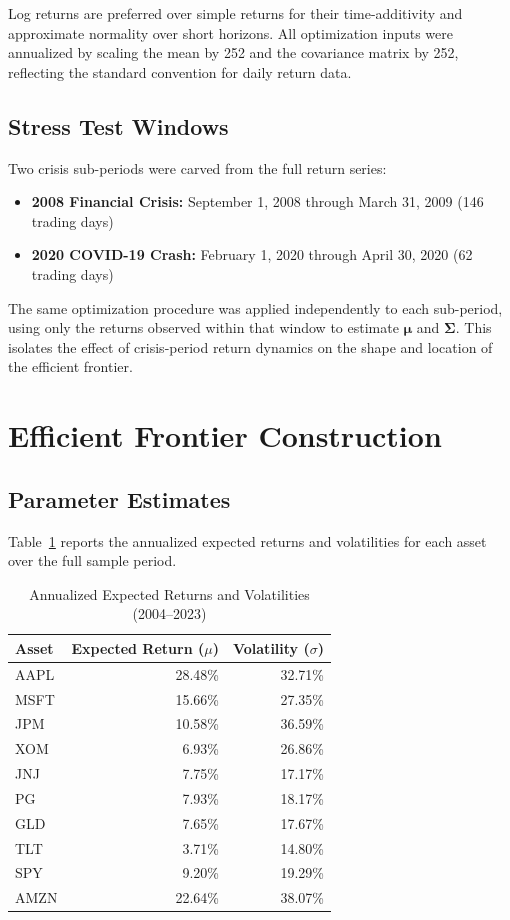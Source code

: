 \documentclass[12pt]{article}
\begin{document}
Log returns are preferred over simple returns for their time-additivity and
approximate normality over short horizons. All optimization inputs were
annualized by scaling the mean by 252 and the covariance matrix by 252,
reflecting the standard convention for daily return data.

\subsection{Stress Test Windows}

Two crisis sub-periods were carved from the full return series:
\begin{itemize}
  \item \textbf{2008 Financial Crisis:} September 1, 2008 through March 31,
        2009 (146 trading days)
  \item \textbf{2020 COVID-19 Crash:} February 1, 2020 through April 30,
        2020 (62 trading days)
\end{itemize}

The same optimization procedure was applied independently to each sub-period,
using only the returns observed within that window to estimate
$\boldsymbol{\mu}$ and $\boldsymbol{\Sigma}$. This isolates the effect of
crisis-period return dynamics on the shape and location of the efficient
frontier.

\section{Efficient Frontier Construction}
\label{sec:frontier}

\subsection{Parameter Estimates}

Table~\ref{tab:params} reports the annualized expected returns and volatilities
for each asset over the full sample period.

\begin{table}[H]
  \centering
  \caption{Annualized Expected Returns and Volatilities (2004--2023)}
  \label{tab:params}
  \begin{tabular}{lrr}
    \toprule
    Asset & Expected Return ($\mu$) & Volatility ($\sigma$) \\
    \midrule
    AAPL & 28.48\% & 32.71\% \\
    MSFT & 15.66\% & 27.35\% \\
    JPM  & 10.58\% & 36.59\% \\
    XOM  &  6.93\% & 26.86\% \\
    JNJ  &  7.75\% & 17.17\% \\
    PG   &  7.93\% & 18.17\% \\
    GLD  &  7.65\% & 17.67\% \\
    TLT  &  3.71\% & 14.80\% \\
    SPY  &  9.20\% & 19.29\% \\
    AMZN & 22.64\% & 38.07\% \\
    \bottomrule
  \end{tabular}
\end{table}
\end{document}
